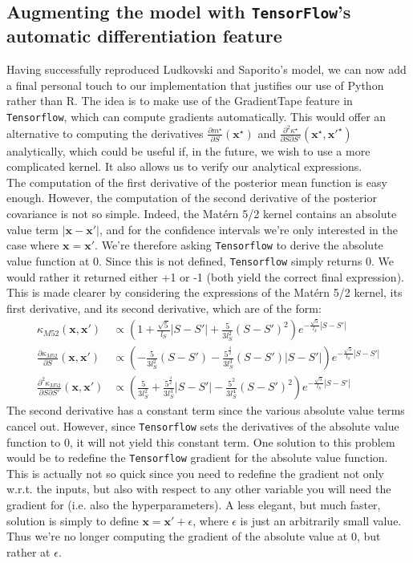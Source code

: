 \documentclass[a4paper,12pt]{article}
\begin{document}
\subsection{Augmenting the model with \texttt{TensorFlow}'s automatic differentiation feature}
Having successfully reproduced Ludkovski and Saporito's model, we can now add a final personal touch to our implementation that justifies our use of Python rather than R. The idea is to make use of the GradientTape feature in \texttt{Tensorflow}, which can compute gradients automatically. This would offer an alternative to computing the derivatives $\frac{\partial m^\star}{\partial S}(\mathbf{x^\star})$ and $\frac{\partial^2 \kappa^\star}{\partial S \partial S'}(\mathbf{x^\star}, \mathbf{x'^\star})$ analytically, which could be useful if, in the future, we wish to use a more complicated kernel. It also allows us to verify our analytical expressions. \\
The computation of the first derivative of the posterior mean function is easy enough. However, the computation of the second derivative of the posterior covariance is not so simple. Indeed, the Matérn 5/2 kernel contains an absolute value term $|\mathbf{x} - \mathbf{x'}|$, and for the confidence intervals we're only interested in the case where $\mathbf{x} = \mathbf{x'}$. We're therefore asking \texttt{Tensorflow} to derive the absolute value function at 0. Since this is not defined, \texttt{Tensorflow} simply returns 0. We would rather it returned either +1 or -1 (both yield the correct final expression). This is made clearer by considering the expressions of the Matérn 5/2 kernel, its first derivative, and its second derivative, which are of the form: 
\begin{align*}
    \kappa_{M52}(\mathbf{x},\mathbf{x'}) & \propto \left (1+\frac{\sqrt{5}}{l_S}|S-S'|+\frac{5}{3l_S^2}(S-S')^2 \right) e^{-\frac{\sqrt{5}}{l_k}|S-S'|}\\
    \frac{\partial \kappa_{M52}}{\partial S}(\mathbf{x},\mathbf{x'}) & \propto \left (-\frac{5}{3 l_S^2}(S-S')-\frac{5^{\frac{3}{2}}}{3 l_S^3}(S-S')|S - S'| \right) e^{-\frac{\sqrt{5}}{l_S}|S-S'|}\\
    \frac{\partial^2 \kappa_{M52}}{\partial S \partial S'}(\mathbf{x},\mathbf{x'}) & \propto \left (\frac{5}{3 l_S^2} + \frac{5^{\frac{3}{2}}}{3 l_S^3}|S - S'| - \frac{5^2}{3 l_S^4}(S-S')^2 \right) e^{-\frac{\sqrt{5}}{l_S}|S-S'|}
\end{align*}
The second derivative has a constant term since the various absolute value terms cancel out. However, since \texttt{Tensorflow} sets the derivatives of the absolute value function to 0, it will not yield this constant term. One solution to this problem would be to redefine the \texttt{Tensorflow} gradient for the absolute value function. This is actually not so quick since you need to redefine the gradient not only  w.r.t. the inputs, but also with respect to any other variable you will need the gradient for (i.e. also the hyperparameters). A less elegant, but much faster, solution is simply to define $\mathbf{x} = \mathbf{x'} + \epsilon$, where $\epsilon$ is just an arbitrarily small value. Thus we're no longer computing the gradient of the absolute value at 0, but rather at $\epsilon$.\\
\end{document}
